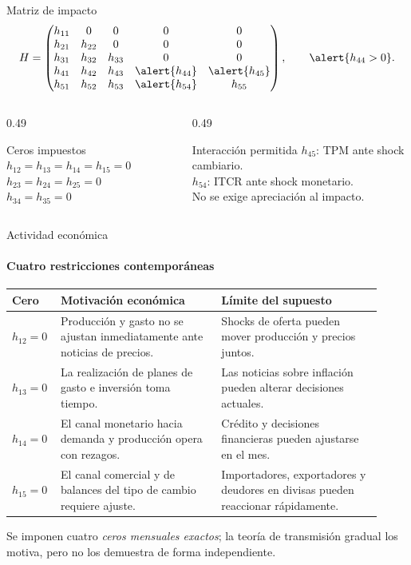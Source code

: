\documentclass{beamer}
\begin{document}
\begin{frame}{Matriz de impacto}
 \begin{equation*}
 H=\begin{pmatrix}
 h_{11}&0&0&0&0\\
 h_{21}&h_{22}&0&0&0\\
 h_{31}&h_{32}&h_{33}&0&0\\
 h_{41}&h_{42}&h_{43}&\alert{h_{44}}&\alert{h_{45}}\\
 h_{51}&h_{52}&h_{53}&\alert{h_{54}}&h_{55}
 \end{pmatrix}, \qquad \alert{h_{44}>0}.
 \end{equation*}
 \begin{columns}[T]
  \begin{column}{0.49\textwidth}
   \begin{block}{Ceros impuestos}
   \scriptsize
   $h_{12}=h_{13}=h_{14}=h_{15}=0$\\
   $h_{23}=h_{24}=h_{25}=0$\\
   $h_{34}=h_{35}=0$
   \end{block}
  \end{column}
  \begin{column}{0.49\textwidth}
   \begin{block}{Interacción permitida}
    \scriptsize
    $h_{45}$: TPM ante shock cambiario.\\
    $h_{54}$: ITCR ante shock monetario.\\
    \alert{No se exige apreciación al impacto.}
   \end{block}
  \end{column}
 \end{columns}
\end{frame}

\begin{frame}{Actividad económica}
 \framesubtitle{Cuatro restricciones contemporáneas}
 \scriptsize
 \renewcommand{\arraystretch}{1.32}
 \begin{tabular}{@{}p{0.105\linewidth}p{0.41\linewidth}p{0.41\linewidth}@{}}
 \toprule
 \textbf{Cero} & \textbf{Motivación económica} & \textbf{Límite del supuesto}\\
 \midrule
 $h_{12}=0$ & Producción y gasto no se ajustan inmediatamente ante noticias de precios. & Shocks de oferta pueden mover producción y precios juntos.\\
 $h_{13}=0$ & La realización de planes de gasto e inversión toma tiempo. & Las noticias sobre inflación pueden alterar decisiones actuales.\\
 $h_{14}=0$ & El canal monetario hacia demanda y producción opera con rezagos. & Crédito y decisiones financieras pueden ajustarse en el mes.\\
 $h_{15}=0$ & El canal comercial y de balances del tipo de cambio requiere ajuste. & Importadores, exportadores y deudores en divisas pueden reaccionar rápidamente.\\
 \bottomrule
 \end{tabular}
 \vfill
  \small Se imponen cuatro \emph{ceros mensuales exactos}; la teoría de transmisión gradual
 los motiva, pero no los demuestra de forma independiente.
\end{frame}
\end{document}
